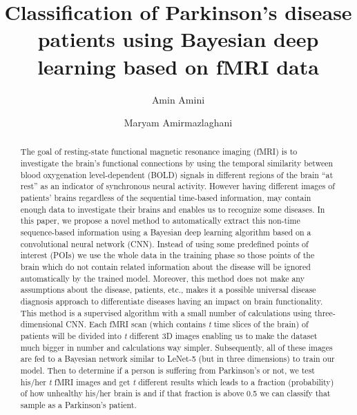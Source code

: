 \documentclass[a4paper,fleqn]{cas-dc}
\begin{document}
\let\WriteBookmarks\relax
\def\floatpagepagefraction{1}
\def\textpagefraction{.001}

\title [mode = title]{Classification of Parkinson's disease patients using Bayesian deep learning based on fMRI data}



\author[1]{Amin Amini}


\author[1]{Maryam Amirmazlaghani}
\cormark[1]


\address[1]{Department of Computer Engineering and Information Technology, Amirkabir University of Technology, Tehran, Iran}



\begin{abstract}
The goal of resting-state functional magnetic resonance imaging (fMRI) is to investigate the brain's functional connections by using the temporal similarity between blood oxygenation level-dependent (BOLD) signals in different regions of the brain “at rest” as an indicator of synchronous neural activity.
However having different images of patients' brains regardless of the sequential time-based information, may contain enough data to investigate their brains and enables us to recognize some diseases.
In this paper, we propose a novel method to automatically extract this non-time sequence-based information using a Bayesian deep learning algorithm based on a convolutional neural network (CNN).
Instead of using some predefined points of interest (POIs) we use the whole data in the training phase so those points of the brain which do not contain related information about the disease will be ignored automatically by the trained model.
Moreover, this method does not make any assumptions about the disease, patients, etc.,
makes it a possible universal disease diagnosis approach to differentiate diseases having an impact on brain functionality.
This method is a supervised algorithm with a small number of calculations using three-dimensional CNN.
Each fMRI scan (which contains {\it t} time slices of the brain) of patients will be divided into {\it t} different 3D images enabling us to make the dataset much bigger in number and calculations way simpler.
Subsequently, all of these images are fed to a Bayesian network similar to LeNet-5 (but in three dimensions) to train our model.
Then to determine if a person is suffering from Parkinson's or not, we test his/her {\it t} fMRI images and get {\it t} different results which leads to a fraction (probability) of how unhealthy his/her brain is and if that fraction is above 0.5 we can classify that sample as a Parkinson's patient.
\end{abstract}
\end{document}

